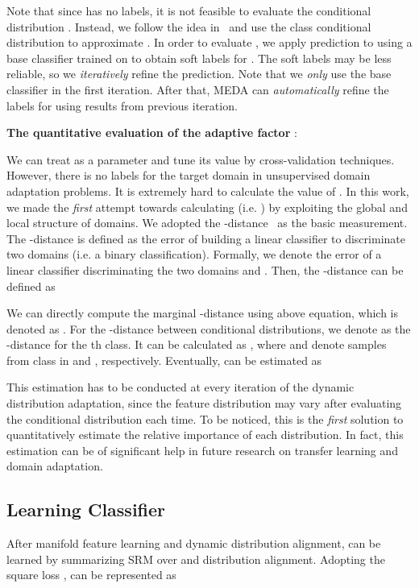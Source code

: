 \documentclass[sigconf]{acmart}
\begin{document}
Note that since  has no labels, it is not feasible to evaluate the conditional distribution . Instead, we follow the idea in~\cite{wang2017balanced} and use the class conditional distribution  to approximate . In order to evaluate , we apply prediction to  using a base classifier trained on  to obtain soft labels for . The soft labels may be less reliable, so we \textit{iteratively} refine the prediction. Note that we \textit{only} use the base classifier in the first iteration. After that, MEDA can \textit{automatically} refine the labels for  using results from previous iteration.

\textbf{The quantitative evaluation of the adaptive factor} :

We can treat  as a parameter and tune its value by cross-validation techniques. However, there is no labels for the target domain in unsupervised domain adaptation problems. It is extremely hard to calculate the value of . In this work, we made the \textit{first} attempt towards calculating  (i.e. ) by exploiting the global and local structure of domains. We adopted the -distance~\cite{ben2007analysis} as the basic measurement. The -distance is defined as the error of building a linear classifier to discriminate two domains (i.e. a binary classification). Formally, we denote  the error of a linear classifier  discriminating the two domains  and . Then, the -distance can be defined as


We can directly compute the marginal -distance using above equation, which is denoted as . For the -distance between conditional distributions, we denote  as the -distance for the th class. It can be calculated as , where  and  denote samples from class  in  and , respectively. Eventually,  can be estimated as



This estimation has to be conducted at every iteration of the dynamic distribution adaptation, since the feature distribution may vary after evaluating the conditional distribution each time. 
To be noticed, this is the \textit{first} solution to quantitatively estimate the relative importance of each distribution. In fact, this estimation can be of significant help in future research on transfer learning and domain adaptation.

\subsection{Learning Classifier }

After manifold feature learning and dynamic distribution alignment,  can be learned by summarizing SRM over  and distribution alignment. Adopting the square loss ,  can be represented as
\end{document}
